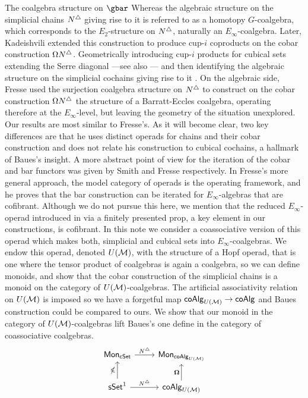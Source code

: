 The coalgebra structure on $\gbar$
Whereas the algebraic structure on the simplicial chains $N^{\triangle}$ giving rise to it is referred to as a homotopy $G$-coalgebra, which corresponds to the $E_2$-structure on $N^{\triangle}$, naturally an $E_\infty$-coalgebra.
Later, Kadeishvili extended this construction to produce cup-$i$ coproducts on the cobar construction $\Omega N^{\triangle}$.
Geometrically introducing cup-$i$ products for cubical sets extending the Serre diagonal \cite{Kadeishvili99coproducts} ---see also \cite{Pilarczyk2016cubical}--- and then identifying the algebraic structure on the simplicial cochains giving rise to it \cite{Kadeishvili03cup-i}.
On the algebraic side, Fresse \cite{Fresse03construction} used the surjection coalgebra structure on $N^{\triangle}$ to construct on the cobar construction $\Omega N^{\triangle}$ the  structure of a Barratt-Eccles coalgebra, operating therefore at the $E_\infty$-level, but leaving the geometry of the situation unexplored.
Our results are most similar to Fresse's.
As it will become clear, two key differences are that he uses distinct operads for chains and their cobar construction and does not relate his construction to cubical cochains, a hallmark of Baues's insight.
A more abstract point of view for the iteration of the cobar and bar functors was given by Smith \cite{Smith94cobar} and Fresse \cite{Fresse10complex} respectively. 
In Fresse's more general approach, the model category of operads is the operating framework, and he proves that the bar construction can be iterated for $E_\infty$-algebras that are cofibrant.
Although we do not pursue this here, we mention that the reduced $E_\infty$-operad introduced in \cite{Medina20prop1} via a finitely presented prop, a key element in our constructions, is cofibrant.
In this note we consider a coassociative version of this operad which makes both, simplicial and cubical sets into $E_\infty$-coalgebras.
We endow this operad, denoted $U(\mathcal{M})$, with the structure of a Hopf operad, that is one where the tensor product of coalgebras is again a coalgebra, so we can define monoids, and show that the cobar construction of the simplicial chains is a monoid on the category of $U(\mathcal{M})$-coalgebras.
The artificial associativity relation on $U(\mathcal{M})$ is imposed so we have a forgetful map $\mathsf{coAlg}_{U(\mathcal{M})} \to \mathsf{coAlg}$ and Baues construction could be compared to ours. We show that our monoid in the category of $U(\mathcal{M})$-coalgebras lift Baues's one define in the category of coassociative coalgebras.
\begin{equation*}
\begin{tikzcd}
\Mon_{\cSet} \arrow[r, "\chains"] & \Mon_{\coAlg_{U(\M)}} \\
\sSet^1 \arrow[r, "\chains"] \arrow[u, "\gcobar"] & \coAlg_{U(\M)} \arrow[u, "\cobar"]
\end{tikzcd}
\end{equation*}

